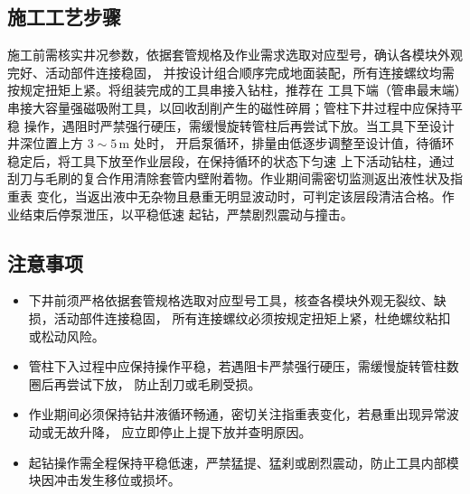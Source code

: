 \subsection{施工工艺步骤}

施工前需核实井况参数，依据套管规格及作业需求选取对应型号，确认各模块外观完好、活动部件连接稳固，
并按设计组合顺序完成地面装配，所有连接螺纹均需按规定扭矩上紧。将组装完成的工具串接入钻柱，推荐在
工具下端（管串最末端）串接大容量强磁吸附工具，以回收刮削产生的磁性碎屑；管柱下井过程中应保持平稳
操作，遇阻时严禁强行硬压，需缓慢旋转管柱后再尝试下放。当工具下至设计井深位置上方 $3\sim5$\,m 处时，
开启泵循环，排量由低逐步调整至设计值，待循环稳定后，将工具下放至作业层段，在保持循环的状态下匀速
上下活动钻柱，通过刮刀与毛刷的复合作用清除套管内壁附着物。作业期间需密切监测返出液性状及指重表
变化，当返出液中无杂物且悬重无明显波动时，可判定该层段清洁合格。作业结束后停泵泄压，以平稳低速
起钻，严禁剧烈震动与撞击。

\subsection{注意事项}

\begin{itemize}
	\item 下井前须严格依据套管规格选取对应型号工具，核查各模块外观无裂纹、缺损，活动部件连接稳固，
	所有连接螺纹必须按规定扭矩上紧，杜绝螺纹粘扣或松动风险。
	\item 管柱下入过程中应保持操作平稳，若遇阻卡严禁强行硬压，需缓慢旋转管柱数圈后再尝试下放，
	防止刮刀或毛刷受损。
	\item 作业期间必须保持钻井液循环畅通，密切关注指重表变化，若悬重出现异常波动或无故升降，
	应立即停止上提下放并查明原因。
	\item 起钻操作需全程保持平稳低速，严禁猛提、猛刹或剧烈震动，防止工具内部模块因冲击发生移位或损坏。
\end{itemize}

